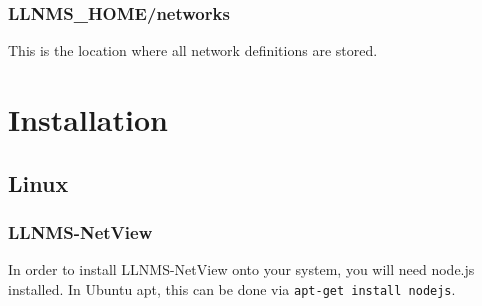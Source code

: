 \documentclass[12pt]{report}
\begin{document}
\subsubsection*{LLNMS\_HOME/networks}
This is the location where all network definitions are stored.

\section*{Installation}

\subsection*{Linux}

\subsubsection*{LLNMS-NetView}
In order to install LLNMS-NetView onto your system, you will need node.js installed. In Ubuntu apt, 
this can be done via \texttt{apt-get install nodejs}.
\end{document}
